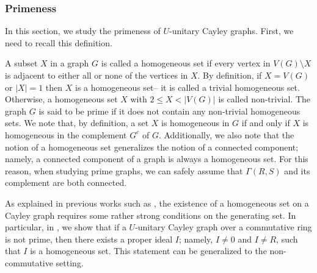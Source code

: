 \documentclass[12pt, a4paper]{amsart}
\theoremstyle{definition}
\numberwithin{equation}{section}
\begin{document}
\subsubsection{Primeness}
In this section, we study the primeness of $U$-unitary Cayley graphs. First, we need to recall this definition. 


A subset $X$ in a graph $G$ is called a homogeneous set if every vertex in $V(G) \setminus X$ is adjacent to either all or none of the vertices in $X$. By definition, if $X=V(G)$ or $|X|=1$ then $X$ is a homogeneous set-- it is called a trivial homogeneous set. Otherwise, a homogeneous set $X$ with $2 \leq X < |V(G)|$ is called non-trivial. The graph $G$ is said to be prime if it does not contain any non-trivial homogeneous sets. We note that, by definition, a set $X$ is homogeneous in $G$ if and only if $X$ is homogeneous in the complement $G^c$ of $G.$ Additionally, we also note that the notion of a homogeneous set generalizes the notion of a connected component; namely, a connected component of a graph is always a homogeneous set. For this reason, when studying prime graphs, we can safely assume that $\Gamma(R,S)$ and its complement are both connected. 



As explained in previous works such as \cite{chudnovsky2024prime, nguyen2025supercharacters, nguyengcd2026}, the existence of a homogeneous set on a Cayley graph requires some rather strong conditions on the generating set.  In particular, in \cite{nguyen2025supercharacters}, we show that if a $U$-unitary Cayley graph over a commutative ring is not prime, then there exists a proper ideal $I$; namely, $I \neq 0$ and $I \neq R$, such that $I$ is a homogeneous set. This statement can be generalized to the non-commutative setting. 
\end{document}
